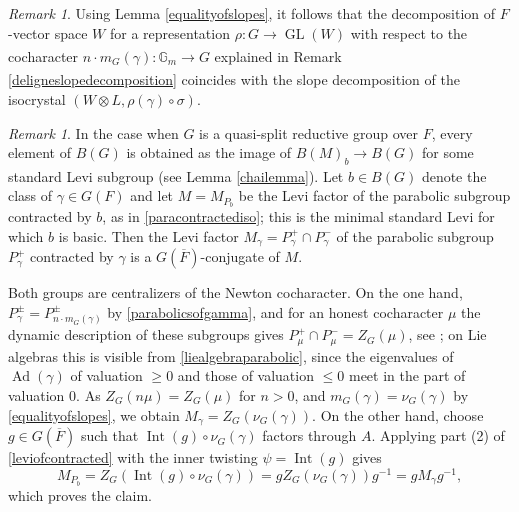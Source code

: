 \documentclass[11pt,a4paper]{article}
\theoremstyle{definition}
\theoremstyle{plain}
\theoremstyle{remark}
\newtheorem{R}[shared]{Remark}
\theoremstyle{plain}
\DeclareMathOperator{\GL}{GL}
\DeclareMathOperator{\Int}{Int}
\DeclareMathOperator{\Ad}{Ad}
\begin{document}
\begin{R}
    Using Lemma \ref{equalityofslopes}, it follows that the decomposition of $F$-vector space $W$ for a representation $\rho: G \xrightarrow[]{} \GL(W)$ with respect to the cocharacter $n \cdot m_G(\gamma): \mathbb{G}_m \xrightarrow[]{} G$ explained in Remark \ref{deligneslopedecomposition} coincides with the slope decomposition of the isocrystal $(W \otimes L, \rho(\gamma)\circ\sigma )$.
\end{R}

\begin{R}
    In the case when $G$ is a quasi-split reductive group over $F$, every element of $B(G)$ is obtained as the image of $B(M)_b \xrightarrow[]{} B(G)$ for some standard Levi subgroup (see Lemma \ref{chailemma}). Let $b \in B(G)$ denote the class of $\gamma \in G(F)$ and let $M = M_{P_b}$ be the Levi factor of the parabolic subgroup contracted by $b$, as in \ref{paracontractediso}; this is the minimal standard Levi for which $b$ is basic. Then the Levi factor $M_{\gamma} = P_{\gamma}^+ \cap P_{\gamma}^-$ of the parabolic subgroup $P_{\gamma}^+$ contracted by $\gamma$ is a $G(\overline{F})$-conjugate of $M$.

    Both groups are centralizers of the Newton cocharacter. On the one hand, $P_{\gamma}^{\pm} = P_{n \cdot m_G(\gamma)}^{\pm}$ by \ref{parabolicsofgamma}, and for an honest cocharacter $\mu$ the dynamic description of these subgroups gives $P_{\mu}^+ \cap P_{\mu}^- = Z_G(\mu)$, see \cite{ConradSGA3}; on Lie algebras this is visible from \ref{liealgebraparabolic}, since the eigenvalues of $\Ad(\gamma)$ of valuation $\geq 0$ and those of valuation $\leq 0$ meet in the part of valuation $0$. As $Z_G(n\mu) = Z_G(\mu)$ for $n > 0$, and $m_G(\gamma) = \nu_G(\gamma)$ by \ref{equalityofslopes}, we obtain $M_{\gamma} = Z_G(\nu_G(\gamma))$. On the other hand, choose $g \in G(\overline{F})$ such that $\Int(g) \circ \nu_G(\gamma)$ factors through $A$. Applying part (2) of \ref{leviofcontracted} with the inner twisting $\psi = \Int(g)$ gives
    $$M_{P_b} = Z_G(\Int(g) \circ \nu_G(\gamma)) = g Z_G(\nu_G(\gamma))g^{-1} = gM_{\gamma}g^{-1},$$
    which proves the claim.
\end{R}
\end{document}

